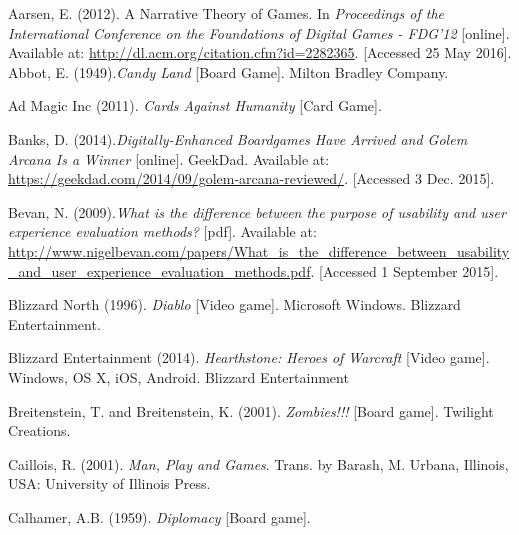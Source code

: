 \documentclass[a4paper,11pt]{report}
\begin{document}
\begin{thebibliography}{1}




Aarsen, E. (2012). A Narrative Theory of Games. In \textit{Proceedings of the International Conference on the Foundations of Digital Games - FDG'12} [online]. Available at: \url{http://dl.acm.org/citation.cfm?id=2282365}. [Accessed 25 May 2016].  
Abbot, E. (1949).\textit{Candy Land} [Board Game]. Milton Bradley Company.

Ad Magic Inc (2011). \textit{Cards Against Humanity} [Card Game].

Banks, D. (2014).\textit{Digitally-Enhanced Boardgames Have Arrived and Golem Arcana Is a Winner} [online]. GeekDad. Available at: \url{https://geekdad.com/2014/09/golem-arcana-reviewed/}. [Accessed 3 Dec. 2015].

Bevan, N. (2009).\textit{What is the difference between the purpose of usability and user experience evaluation methods?} [pdf]. Available at: \url{http://www.nigelbevan.com/papers/What_is_the_difference_between_usability_and_user_experience_evaluation_methods.pdf}. [Accessed 1 September 2015].

Blizzard North (1996). \textit{Diablo} [Video game]. Microsoft Windows. Blizzard Entertainment.

Blizzard Entertainment (2014). \textit{Hearthstone: Heroes of Warcraft} [Video game]. Windows, OS X, iOS, Android.   Blizzard Entertainment

Breitenstein, T. and Breitenstein, K. (2001). \textit{Zombies!!!} [Board game]. Twilight Creations.

Caillois, R. (2001). \textit{Man, Play and Games}. Trans. by Barash, M. Urbana, Illinois, USA: University of Illinois Press.

Calhamer, A.B. (1959). \textit{Diplomacy} [Board game].


\end{thebibliography}
\end{document}

